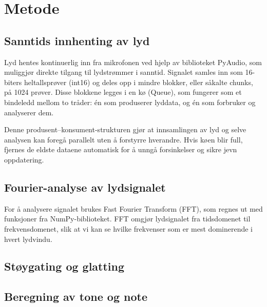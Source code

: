 \section{Metode}
\subsection{Sanntids innhenting av lyd}
Lyd hentes kontinuerlig inn fra mikrofonen ved hjelp av biblioteket PyAudio, som muliggjør direkte tilgang til lydstrømmer i sanntid. Signalet samles inn som 16-biters heltallsprøver (int16) og deles opp i mindre blokker, eller såkalte chunks, på 1024 prøver. Disse blokkene legges i en kø (Queue), som fungerer som et bindeledd mellom to tråder: én som produserer lyddata, og én som forbruker og analyserer dem.

Denne produsent–konsument-strukturen gjør at innsamlingen av lyd og selve analysen kan foregå parallelt uten å forstyrre hverandre. Hvis køen blir full, fjernes de eldste dataene automatisk for å unngå forsinkelser og sikre jevn oppdatering.

\subsection{Fourier-analyse av lydsignalet}
For å analysere signalet brukes Fast Fourier Transform (FFT), som regnes ut med funksjoner fra NumPy-biblioteket. FFT omgjør lydsignalet fra tidsdomenet til frekvensdomenet, slik at vi kan se hvilke frekvenser som er mest dominerende i hvert lydvindu.

\subsection{Støygating og glatting}

\subsection{Beregning av tone og note}